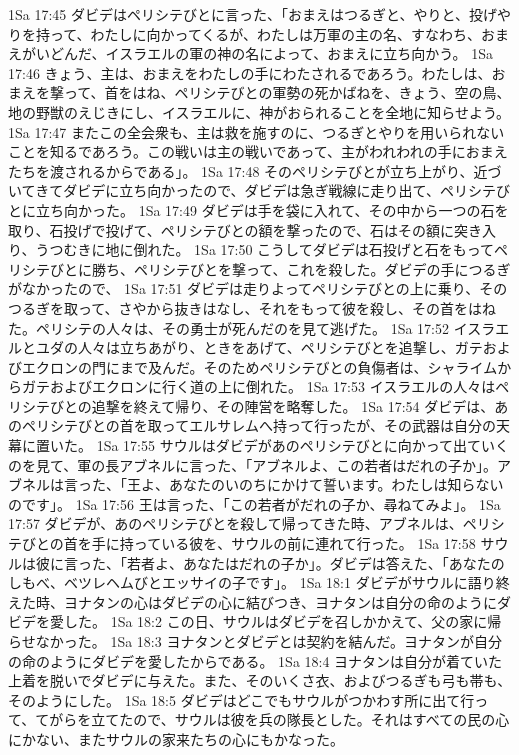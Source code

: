 1Sa 17:45  ダビデはペリシテびとに言った、「おまえはつるぎと、やりと、投げやりを持って、わたしに向かってくるが、わたしは万軍の主の名、すなわち、おまえがいどんだ、イスラエルの軍の神の名によって、おまえに立ち向かう。
1Sa 17:46  きょう、主は、おまえをわたしの手にわたされるであろう。わたしは、おまえを撃って、首をはね、ペリシテびとの軍勢の死かばねを、きょう、空の鳥、地の野獣のえじきにし、イスラエルに、神がおられることを全地に知らせよう。
1Sa 17:47  またこの全会衆も、主は救を施すのに、つるぎとやりを用いられないことを知るであろう。この戦いは主の戦いであって、主がわれわれの手におまえたちを渡されるからである」。
1Sa 17:48  そのペリシテびとが立ち上がり、近づいてきてダビデに立ち向かったので、ダビデは急ぎ戦線に走り出て、ペリシテびとに立ち向かった。
1Sa 17:49  ダビデは手を袋に入れて、その中から一つの石を取り、石投げで投げて、ペリシテびとの額を撃ったので、石はその額に突き入り、うつむきに地に倒れた。
1Sa 17:50  こうしてダビデは石投げと石をもってペリシテびとに勝ち、ペリシテびとを撃って、これを殺した。ダビデの手につるぎがなかったので、
1Sa 17:51  ダビデは走りよってペリシテびとの上に乗り、そのつるぎを取って、さやから抜きはなし、それをもって彼を殺し、その首をはねた。ペリシテの人々は、その勇士が死んだのを見て逃げた。
1Sa 17:52  イスラエルとユダの人々は立ちあがり、ときをあげて、ペリシテびとを追撃し、ガテおよびエクロンの門にまで及んだ。そのためペリシテびとの負傷者は、シャライムからガテおよびエクロンに行く道の上に倒れた。
1Sa 17:53  イスラエルの人々はペリシテびとの追撃を終えて帰り、その陣営を略奪した。
1Sa 17:54  ダビデは、あのペリシテびとの首を取ってエルサレムへ持って行ったが、その武器は自分の天幕に置いた。
1Sa 17:55  サウルはダビデがあのペリシテびとに向かって出ていくのを見て、軍の長アブネルに言った、「アブネルよ、この若者はだれの子か」。アブネルは言った、「王よ、あなたのいのちにかけて誓います。わたしは知らないのです」。
1Sa 17:56  王は言った、「この若者がだれの子か、尋ねてみよ」。
1Sa 17:57  ダビデが、あのペリシテびとを殺して帰ってきた時、アブネルは、ペリシテびとの首を手に持っている彼を、サウルの前に連れて行った。
1Sa 17:58  サウルは彼に言った、「若者よ、あなたはだれの子か」。ダビデは答えた、「あなたのしもべ、ベツレヘムびとエッサイの子です」。
1Sa 18:1  ダビデがサウルに語り終えた時、ヨナタンの心はダビデの心に結びつき、ヨナタンは自分の命のようにダビデを愛した。
1Sa 18:2  この日、サウルはダビデを召しかかえて、父の家に帰らせなかった。
1Sa 18:3  ヨナタンとダビデとは契約を結んだ。ヨナタンが自分の命のようにダビデを愛したからである。
1Sa 18:4  ヨナタンは自分が着ていた上着を脱いでダビデに与えた。また、そのいくさ衣、およびつるぎも弓も帯も、そのようにした。
1Sa 18:5  ダビデはどこでもサウルがつかわす所に出て行って、てがらを立てたので、サウルは彼を兵の隊長とした。それはすべての民の心にかない、またサウルの家来たちの心にもかなった。
